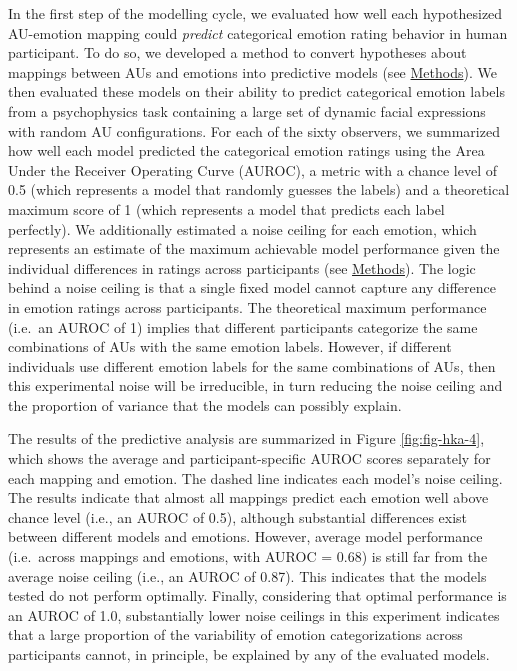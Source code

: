 \documentclass[11pt,american,a4paper,oneside,]{memoir} %
\begin{document}
In the first step of the modelling cycle, we evaluated how well each hypothesized AU-emotion mapping could \emph{predict} categorical emotion rating behavior in human participant. To do so, we developed a method to convert hypotheses about mappings between AUs and emotions into predictive models (see \protect\hyperlink{hka-methods}{Methods}). We then evaluated these models on their ability to predict categorical emotion labels from a psychophysics task containing a large set of dynamic facial expressions with random AU configurations. For each of the sixty observers, we summarized how well each model predicted the categorical emotion ratings using the Area Under the Receiver Operating Curve (AUROC), a metric with a chance level of 0.5 (which represents a model that randomly guesses the labels) and a theoretical maximum score of 1 (which represents a model that predicts each label perfectly). We additionally estimated a noise ceiling for each emotion, which represents an estimate of the maximum achievable model performance given the individual differences in ratings across participants (see \protect\hyperlink{methods}{Methods}). The logic behind a noise ceiling is that a single fixed model cannot capture any difference in emotion ratings across participants. The theoretical maximum performance (i.e.~an AUROC of 1) implies that different participants categorize the same combinations of AUs with the same emotion labels. However, if different individuals use different emotion labels for the same combinations of AUs, then this experimental noise will be irreducible, in turn reducing the noise ceiling and the proportion of variance that the models can possibly explain.

The results of the predictive analysis are summarized in Figure \ref{fig:fig-hka-4}, which shows the average and participant-specific AUROC scores separately for each mapping and emotion. The dashed line indicates each model's noise ceiling. The results indicate that almost all mappings predict each emotion well above chance level (i.e., an AUROC of 0.5), although substantial differences exist between different models and emotions. However, average model performance (i.e.~across mappings and emotions, with AUROC = 0.68) is still far from the average noise ceiling (i.e., an AUROC of 0.87). This indicates that the models tested do not perform optimally. Finally, considering that optimal performance is an AUROC of 1.0, substantially lower noise ceilings in this experiment indicates that a large proportion of the variability of emotion categorizations across participants cannot, in principle, be explained by any of the evaluated models.
\end{document}
